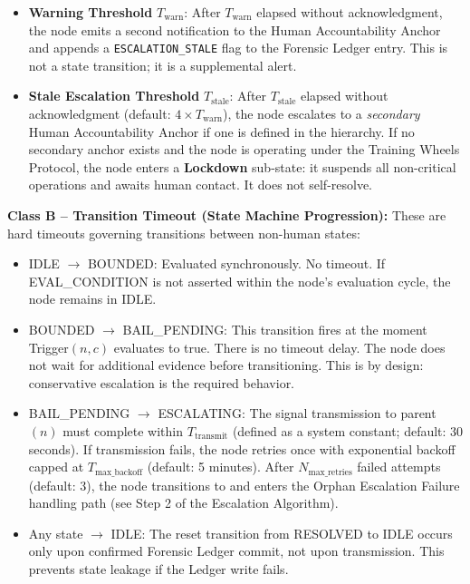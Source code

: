 \begin{itemize}
  \item \textbf{Warning Threshold} $T_{\text{warn}}$: After $T_{\text{warn}}$ elapsed without acknowledgment, the node emits a second notification to the Human Accountability Anchor and appends a \texttt{ESCALATION\_STALE} flag to the Forensic Ledger entry. This is not a state transition; it is a supplemental alert.
  \item \textbf{Stale Escalation Threshold} $T_{\text{stale}}$: After $T_{\text{stale}}$ elapsed without acknowledgment (default: $4 \times T_{\text{warn}}$), the node escalates to a \emph{secondary} Human Accountability Anchor if one is defined in the hierarchy. If no secondary anchor exists and the node is operating under the Training Wheels Protocol, the node enters a \textbf{Lockdown} sub-state: it suspends all non-critical operations and awaits human contact. It does not self-resolve.
\end{itemize}

\medskip
\noindent\textbf{Class B -- Transition Timeout (State Machine Progression):} These are hard timeouts governing transitions between non-human states:

\begin{itemize}
  \item IDLE $\rightarrow$ BOUNDED: Evaluated synchronously. No timeout. If EVAL\_CONDITION is not asserted within the node's evaluation cycle, the node remains in IDLE.
  \item BOUNDED $\rightarrow$ BAIL\_PENDING: This transition fires at the moment Trigger$(n, c)$ evaluates to true. There is no timeout delay. The node does not wait for additional evidence before transitioning. This is by design: conservative escalation is the required behavior.
  \item BAIL\_PENDING $\rightarrow$ ESCALATING: The signal transmission to parent$(n)$ must complete within $T_{\text{transmit}}$ (defined as a system constant; default: 30 seconds). If transmission fails, the node retries once with exponential backoff capped at $T_{\text{max\_backoff}}$ (default: 5 minutes). After $N_{\text{max\_retries}}$ failed attempts (default: 3), the node transitions to  and enters the Orphan Escalation Failure handling path (see Step 2 of the Escalation Algorithm).
  \item Any state $\rightarrow$ IDLE: The reset transition from RESOLVED to IDLE occurs only upon confirmed Forensic Ledger commit, not upon transmission. This prevents state leakage if the Ledger write fails.
\end{itemize}

